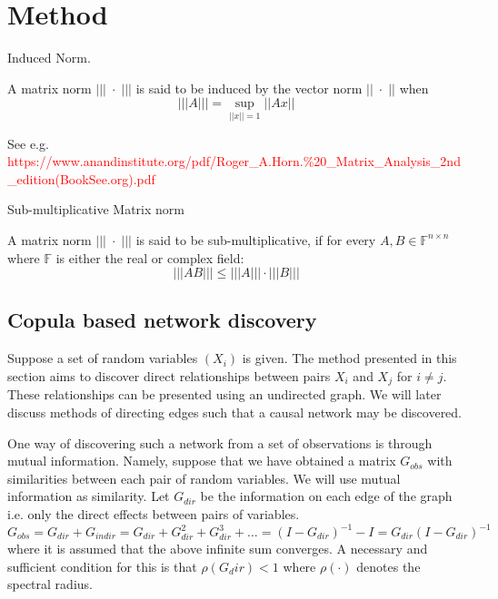 \documentclass[../Thesis.tex]{subfiles}
\begin{document}
\chapter{Method}

\begin{definition}\label{def:induced norm}
    Induced Norm.

    A matrix norm $\left|\left|\left|\;\cdot\;\right|\right|\right|$ is said to be induced by the vector norm $||\;\cdot\;||$  when
    $$\left|\left|\left|A\right|\right|\right| = \sup_{\left|\left|x\right|\right| = 1} ||Ax||$$
\end{definition}
See e.g. \textcolor{red}{https://www.anandinstitute.org/pdf/Roger_A.Horn.\%20_Matrix_Analysis_2nd_edition(BookSee.org).pdf}

\begin{definition}\label{def:sub-multiplicative matrix norm}
    Sub-multiplicative Matrix norm

    A matrix norm $\left|\left|\left| \; \cdot \; \right|\right|\right|$ is said to be sub-multiplicative, if for every $A,B \in \mathbb{F}^{n\times n}$ where $\mathbb{F}$ is either the real or complex field:
    $$\left|\left|\left| AB\right|\right|\right| \leq \left|\left|\left| A \right|\right|\right|\cdot \left|\left|\left| B \right|\right|\right|$$
\end{definition}

\section{Copula based network discovery}
Suppose a set of random variables $(X_i)$ is given. The method presented in this section aims to discover direct relationships between pairs $X_i$ and $X_j$ for $i\neq j$. These relationships can be presented using an undirected graph. We will later discuss methods of directing edges such that a causal network may be discovered.

One way of discovering such a network from a set of observations is through mutual information. Namely, suppose that we have obtained a matrix $G_{obs}$ with similarities between each pair of random variables. We will use mutual information as similarity. Let $G_{dir}$ be the information on each edge of the graph i.e. only the direct effects between pairs of variables.
$$G_{obs} = G_{dir} + G_{indir} = G_{dir} + G_{dir}^2 + G_{dir}^3 + \dots = \left(I - G_{dir}\right)^{-1} - I = G_{dir} \left(I - G_{dir}\right)^{-1}$$
where it is assumed that the above infinite sum converges. A necessary and sufficient condition for this is that $\rho \left(G_dir\right) < 1$ where $\rho\left( \cdot \right)$ denotes the spectral radius.
\end{document}
